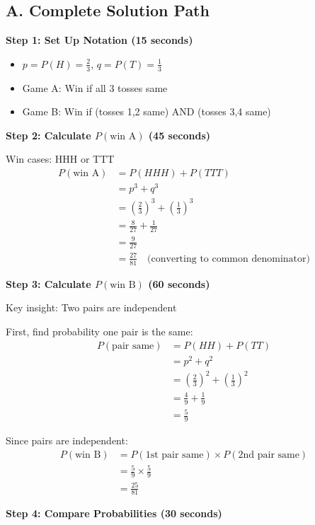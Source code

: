 \documentclass[]{article}
\begin{document}
\begin{solutionbox}
\subsection*{A. Complete Solution Path}

\textbf{Step 1: Set Up Notation (15 seconds)}
\begin{itemize}[leftmargin=*]
    \item $p = P(H) = \frac{2}{3}$, $q = P(T) = \frac{1}{3}$
    \item Game A: Win if all 3 tosses same
    \item Game B: Win if (tosses 1,2 same) AND (tosses 3,4 same)
\end{itemize}

\textbf{Step 2: Calculate $P(\text{win A})$ (45 seconds)}

Win cases: HHH or TTT
\begin{align*}
P(\text{win A}) &= P(HHH) + P(TTT)\\
&= p^3 + q^3\\
&= \left(\frac{2}{3}\right)^3 + \left(\frac{1}{3}\right)^3\\
&= \frac{8}{27} + \frac{1}{27}\\
&= \frac{9}{27}\\
&= \frac{27}{81} \quad \text{(converting to common denominator)}
\end{align*}

\textbf{Step 3: Calculate $P(\text{win B})$ (60 seconds)}

Key insight: Two pairs are independent

First, find probability one pair is the same:
\begin{align*}
P(\text{pair same}) &= P(HH) + P(TT)\\
&= p^2 + q^2\\
&= \left(\frac{2}{3}\right)^2 + \left(\frac{1}{3}\right)^2\\
&= \frac{4}{9} + \frac{1}{9}\\
&= \frac{5}{9}
\end{align*}

Since pairs are independent:
\begin{align*}
P(\text{win B}) &= P(\text{1st pair same}) \times P(\text{2nd pair same})\\
&= \frac{5}{9} \times \frac{5}{9}\\
&= \frac{25}{81}
\end{align*}

\textbf{Step 4: Compare Probabilities (30 seconds)}


\end{solutionbox}
\end{document}
